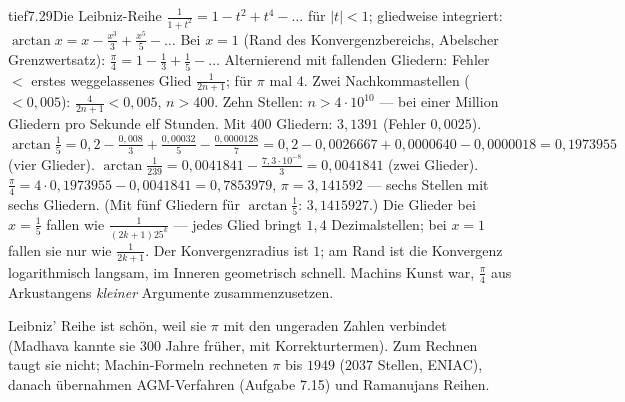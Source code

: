 \begin{loesungkarte}{tief}{7.29}{Die Leibniz-Reihe}
$\frac1{1 + t^{2}} = 1 - t^{2} + t^{4} - \dots$ für $|t| < 1$; gliedweise integriert: $\arctan x = x - \frac{x^{3}}3 + \frac{x^{5}}5 - \dots$ Bei $x = 1$ (Rand des Konvergenzbereichs, Abelscher Grenzwertsatz): $\frac\pi4 = 1 - \frac13 + \frac15 - \dots$
Alternierend mit fallenden Gliedern: Fehler $< $ erstes weggelassenes Glied $\frac1{2n + 1}$; für $\pi$ mal $4$. Zwei Nachkommastellen ($< 0{,}005$): $\frac4{2n + 1} < 0{,}005$, $n > 400$. Zehn Stellen: $n > 4\cdot10^{10}$ --- bei einer Million Gliedern pro Sekunde elf Stunden. Mit $400$ Gliedern: $3{,}1391$ (Fehler $0{,}0025$). \checkmark
{}
$\arctan\frac15 = 0{,}2 - \frac{0{,}008}3 + \frac{0{,}00032}5 - \frac{0{,}0000128}7 = 0{,}2 - 0{,}0026667 + 0{,}0000640 - 0{,}0000018 = 0{,}1973955$ (vier Glieder). $\arctan\frac1{239} = 0{,}0041841 - \frac{7{,}3\cdot10^{-8}}3 = 0{,}0041841$ (zwei Glieder). $\frac\pi4 = 4\cdot0{,}1973955 - 0{,}0041841 = 0{,}7853979$, $\pi = 3{,}141592$ --- sechs Stellen mit sechs Gliedern. (Mit fünf Gliedern für $\arctan\frac15$: $3{,}1415927$.)
Die Glieder bei $x = \frac15$ fallen wie $\frac1{(2k + 1)25^{k}}$ --- jedes Glied bringt $1{,}4$ Dezimalstellen; bei $x = 1$ fallen sie nur wie $\frac1{2k + 1}$. Der Konvergenzradius ist $1$; am Rand ist die Konvergenz logarithmisch langsam, im Inneren geometrisch schnell. Machins Kunst war, $\frac\pi4$ aus Arkustangens \emph{kleiner} Argumente zusammenzusetzen.
\begin{mitnehmen}\kastentext
Leibniz' Reihe ist schön, weil sie $\pi$ mit den ungeraden Zahlen verbindet (Madhava kannte sie $300$ Jahre früher, mit Korrekturtermen). Zum Rechnen taugt sie nicht; Machin-Formeln rechneten $\pi$ bis $1949$ ($2037$ Stellen, ENIAC), danach übernahmen AGM-Verfahren (Aufgabe 7.15) und Ramanujans Reihen.
\end{mitnehmen}
\end{loesungkarte}

